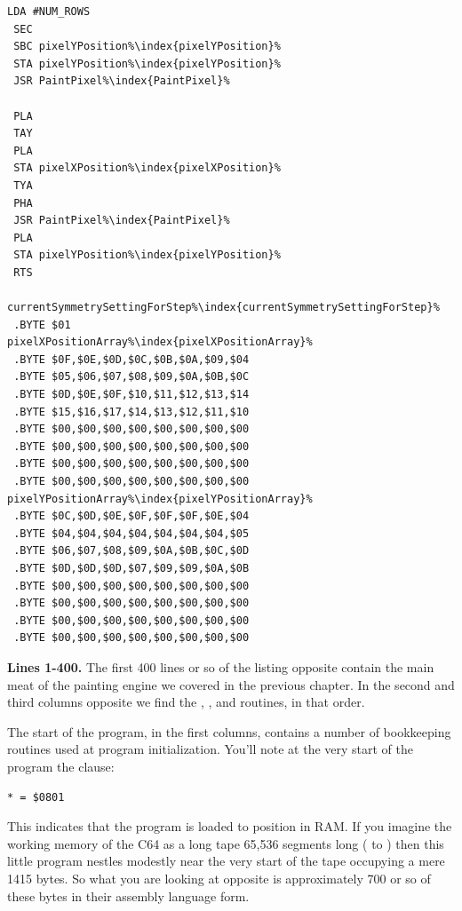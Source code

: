 \begin{minipage}[b]{0.33\linewidth}
\begin{lrbox}{\mybox}
\begin{lstlisting}[basicstyle=\ttfamily\tiny,escapechar=\%]
 LDA #NUM_ROWS
 SEC 
 SBC pixelYPosition%\index{pixelYPosition}%
 STA pixelYPosition%\index{pixelYPosition}%
 JSR PaintPixel%\index{PaintPixel}%

 PLA 
 TAY 
 PLA 
 STA pixelXPosition%\index{pixelXPosition}%
 TYA 
 PHA 
 JSR PaintPixel%\index{PaintPixel}%
 PLA 
 STA pixelYPosition%\index{pixelYPosition}%
 RTS 

currentSymmetrySettingForStep%\index{currentSymmetrySettingForStep}%
 .BYTE $01
pixelXPositionArray%\index{pixelXPositionArray}%   
 .BYTE $0F,$0E,$0D,$0C,$0B,$0A,$09,$04
 .BYTE $05,$06,$07,$08,$09,$0A,$0B,$0C
 .BYTE $0D,$0E,$0F,$10,$11,$12,$13,$14
 .BYTE $15,$16,$17,$14,$13,$12,$11,$10
 .BYTE $00,$00,$00,$00,$00,$00,$00,$00
 .BYTE $00,$00,$00,$00,$00,$00,$00,$00
 .BYTE $00,$00,$00,$00,$00,$00,$00,$00
 .BYTE $00,$00,$00,$00,$00,$00,$00,$00
pixelYPositionArray%\index{pixelYPositionArray}%   
 .BYTE $0C,$0D,$0E,$0F,$0F,$0F,$0E,$04
 .BYTE $04,$04,$04,$04,$04,$04,$04,$05
 .BYTE $06,$07,$08,$09,$0A,$0B,$0C,$0D
 .BYTE $0D,$0D,$0D,$07,$09,$09,$0A,$0B
 .BYTE $00,$00,$00,$00,$00,$00,$00,$00
 .BYTE $00,$00,$00,$00,$00,$00,$00,$00
 .BYTE $00,$00,$00,$00,$00,$00,$00,$00
 .BYTE $00,$00,$00,$00,$00,$00,$00,$00
\end{lstlisting}
\end{lrbox}%
\scalebox{0.8}{\usebox{\mybox}}
\end{minipage}
\clearpage
\textbf{Lines 1-400. } The first 400 lines or so of the listing opposite
contain the main meat of the painting engine we covered in the previous chapter. In the second
and third columns opposite we find the , ,
and  routines, in that order.

The start of the program, in the first columns, contains a number of bookkeeping routines used
at program initialization. You'll note at the very start of the program the clause:
\begin{lstlisting}[escapechar=\%]
* = $0801
\end{lstlisting}
This indicates that the program is loaded to position  in RAM. If you imagine the
working memory of the C64 as a long tape 65,536 segments long ( to ) then
this little program nestles modestly near the very start of the tape occupying a mere 1415 bytes. So
what you are looking at opposite is approximately 700 or so of these bytes in their assembly language
form.

